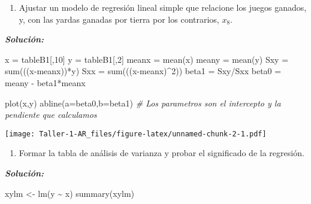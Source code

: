 \documentclass[
]{article}
\newenvironment{Shaded}{\begin{snugshade}}{\end{snugshade}}
\newcommand{\AttributeTok}[1]{\textcolor[rgb]{0.77,0.63,0.00}{#1}}
\newcommand{\CommentTok}[1]{\textcolor[rgb]{0.56,0.35,0.01}{\textit{#1}}}
\newcommand{\DecValTok}[1]{\textcolor[rgb]{0.00,0.00,0.81}{#1}}
\newcommand{\FunctionTok}[1]{\textcolor[rgb]{0.00,0.00,0.00}{#1}}
\newcommand{\NormalTok}[1]{#1}
\newcommand{\OtherTok}[1]{\textcolor[rgb]{0.56,0.35,0.01}{#1}}
\newcommand{\SpecialCharTok}[1]{\textcolor[rgb]{0.00,0.00,0.00}{#1}}
\providecommand{\tightlist}{%
  \setlength{\itemsep}{0pt}\setlength{\parskip}{0pt}}
\begin{document}
\begin{enumerate}
\def\labelenumi{\alph{enumi}.}
\tightlist
\item
  Ajustar un modelo de regresión lineal simple que relacione los juegos
  ganados, y, con las yardas ganadas por tierra por los contrarios,
  \(x_8\).
\end{enumerate}

\textbf{\emph{Solución:}}

\begin{Shaded}
\begin{Highlighting}[]
\NormalTok{x }\OtherTok{=}\NormalTok{ tableB1[,}\DecValTok{10}\NormalTok{]}
\NormalTok{y }\OtherTok{=}\NormalTok{ tableB1[,}\DecValTok{2}\NormalTok{]}
\NormalTok{meanx }\OtherTok{=} \FunctionTok{mean}\NormalTok{(x)}
\NormalTok{meany }\OtherTok{=} \FunctionTok{mean}\NormalTok{(y)}
\NormalTok{Sxy }\OtherTok{=} \FunctionTok{sum}\NormalTok{(((x}\SpecialCharTok{{-}}\NormalTok{meanx))}\SpecialCharTok{*}\NormalTok{y)}
\NormalTok{Sxx }\OtherTok{=} \FunctionTok{sum}\NormalTok{(((x}\SpecialCharTok{{-}}\NormalTok{meanx)}\SpecialCharTok{\^{}}\DecValTok{2}\NormalTok{))}
\NormalTok{beta1 }\OtherTok{=}\NormalTok{ Sxy}\SpecialCharTok{/}\NormalTok{Sxx}
\NormalTok{beta0 }\OtherTok{=}\NormalTok{ meany }\SpecialCharTok{{-}}\NormalTok{ beta1}\SpecialCharTok{*}\NormalTok{meanx}

\FunctionTok{plot}\NormalTok{(x,y)}
\FunctionTok{abline}\NormalTok{(}\AttributeTok{a=}\NormalTok{beta0,}\AttributeTok{b=}\NormalTok{beta1) }\CommentTok{\# Los parametros son el intercepto y la pendiente que calculamos}
\end{Highlighting}
\end{Shaded}

\texttt{[image: Taller-1-AR\_files/figure-latex/unnamed-chunk-2-1.pdf]}

\begin{enumerate}
\def\labelenumi{\alph{enumi}.}
\setcounter{enumi}{1}
\tightlist
\item
  Formar la tabla de análisis de varianza y probar el significado de la
  regresión.
\end{enumerate}

\textbf{\emph{Solución:}}

\begin{Shaded}
\begin{Highlighting}[]
\NormalTok{xylm }\OtherTok{\textless{}{-}} \FunctionTok{lm}\NormalTok{(y }\SpecialCharTok{\textasciitilde{}}\NormalTok{ x)}
\FunctionTok{summary}\NormalTok{(xylm)}
\end{Highlighting}
\end{Shaded}
\end{document}
